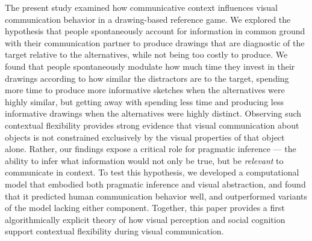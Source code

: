 \documentclass[9pt,twocolumn,twoside]{pnas-new}
\begin{document}
The present study examined how communicative context influences visual communication behavior in a drawing-based reference game. 
We explored the hypothesis that people spontaneously account for information in common ground with their communication partner to produce drawings that are diagnostic of the target relative to the alternatives, while not being too costly to produce. 
We found that people spontaneously modulate how much time they invest in their drawings according to how similar the distractors are to the target, spending more time to produce more informative sketches when the alternatives were highly similar, but getting away with spending less time and producing less informative drawings when the alternatives were highly distinct.
Observing such contextual flexibility provides strong evidence that visual communication about objects is not constrained exclusively by the visual properties of that object alone.  
Rather, our findings expose a critical role for pragmatic inference --- the ability to infer what information would not only be true, but be \textit{relevant} to communicate in context.
To test this hypothesis, we developed a computational model that embodied both pragmatic inference and visual abstraction, and found that it predicted human communication behavior well, and outperformed variants of the model lacking either component. 
Together, this paper provides a first algorithmically explicit theory of how visual perception and social cognition support contextual flexibility during visual communication.
\end{document}
